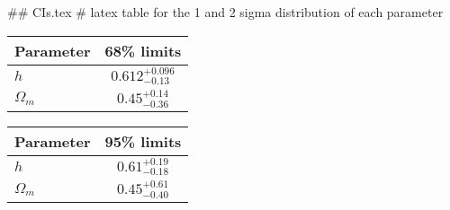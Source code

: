 ## CIs.tex
# latex table for the 1 and 2 sigma distribution of each parameter

\begin{tabular} { l  c}
 Parameter &  68\% limits\\
\hline
{\boldmath$h              $} & $0.612^{+0.096}_{-0.13}    $\\
{\boldmath$\Omega_m       $} & $0.45^{+0.14}_{-0.36}      $\\
\hline
\end{tabular}

\begin{tabular} { l  c}
 Parameter &  95\% limits\\
\hline
{\boldmath$h              $} & $0.61^{+0.19}_{-0.18}      $\\
{\boldmath$\Omega_m       $} & $0.45^{+0.61}_{-0.40}      $\\
\hline
\end{tabular}
